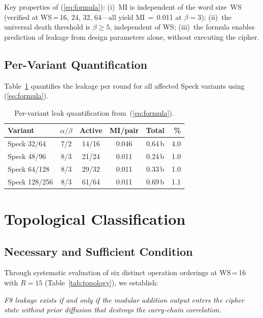 \documentclass[conference,a4paper]{IEEEtran}
\begin{document}
Key properties of (\ref{eq:formula}): (i)~MI is independent of the word size~WS (verified at WS\,=\,16, 24, 32, 64---all yield MI\,$=$\,0.011 at $\beta{=}3$); (ii)~the universal death threshold is $\beta \geq 5$, independent of WS; (iii)~the formula enables prediction of leakage from design parameters alone, without executing the cipher.

\subsection{Per-Variant Quantification}

Table~\ref{tab:variants} quantifies the leakage per round for all affected Speck variants using (\ref{eq:formula}).

\begin{table}[t]
\centering
\caption{Per-variant leak quantification from~(\ref{eq:formula}).}
\label{tab:variants}
\begin{tabular}{@{}lccccr@{}}
\toprule
\textbf{Variant} & $\alpha/\beta$ & \textbf{Active} & \textbf{MI/pair} & \textbf{Total} & \textbf{\%} \\
\midrule
Speck 32/64   & 7/2 & 14/16 & 0.046 & 0.64\,b & 4.0 \\
Speck 48/96   & 8/3 & 21/24 & 0.011 & 0.24\,b & 1.0 \\
Speck 64/128  & 8/3 & 29/32 & 0.011 & 0.33\,b & 1.0 \\
Speck 128/256 & 8/3 & 61/64 & 0.011 & 0.69\,b & 1.1 \\
\bottomrule
\end{tabular}
\end{table}

\section{Topological Classification}

\subsection{Necessary and Sufficient Condition}

Through systematic evaluation of six distinct operation orderings at WS\,=\,16 with $R{=}15$ (Table~\ref{tab:topology}), we establish:

\textit{F8 leakage exists if and only if the modular addition output enters the cipher state without prior diffusion that destroys the carry-chain correlation.}
\end{document}
